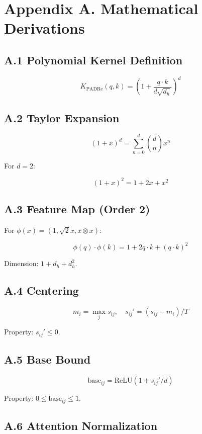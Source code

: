 \section{Appendix A. Mathematical Derivations}

\subsection{A.1 Polynomial Kernel Definition}

\[
K_\text{PADRe}(q, k) = \left(1 + \frac{q \cdot k}{d \sqrt{d_h}}\right)^d
\tag{A.1}
\]

\subsection{A.2 Taylor Expansion}

\[
(1 + x)^d = \sum_{n=0}^{d} \binom{d}{n} x^n
\tag{A.2}
\]

For $d = 2$:

\[
(1 + x)^2 = 1 + 2x + x^2
\tag{A.3}
\]

\subsection{A.3 Feature Map (Order 2)}

For $\phi(x) = (1, \sqrt{2} x, x \otimes x)$:

\[
\phi(q) \cdot \phi(k) = 1 + 2 q \cdot k + (q \cdot k)^2
\tag{A.4}
\]

Dimension: $1 + d_h + d_h^2$.

\subsection{A.4 Centering}

\[
m_i = \max_j s_{ij}, \quad s_{ij}' = (s_{ij} - m_i)/T
\tag{A.5}
\]

Property: $s_{ij}' \leq 0$.

\subsection{A.5 Base Bound}

\[
\text{base}_{ij} = \text{ReLU}(1 + s_{ij}'/d)
\tag{A.6}
\]

Property: $0 \leq \text{base}_{ij} \leq 1$.

\subsection{A.6 Attention Normalization}


